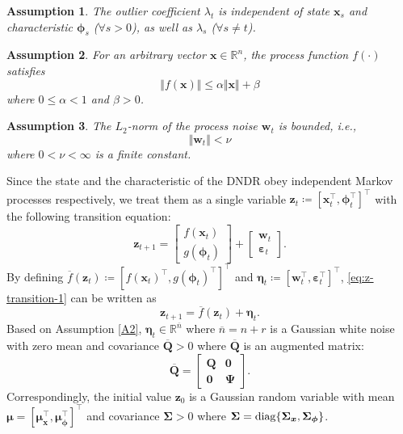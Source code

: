 \documentclass[10pt,twocolumn,twoside]{IEEEtran}
\newtheorem{assumption}{Assumption}
\newcommand{\diag}[1]{{\rm diag}\{#1\}}
\newcommand{\fs}{\text{.}} %
\newcommand{\x}{{ \bm{x} }}
\newcommand{\z}{{ \bm{z} }}
\begin{document}
\begin{assumption} \label{A3}
The outlier coefficient $\lambda_t$ is independent of state $\x_s$ and characteristic $\bm\phi_s$ ($\forall s>0$), as well as $\lambda_s$ ($\forall s\neq t$).
\end{assumption}

\begin{assumption} \label{A4}
For an arbitrary vector $\x\in\mathbb{R}^{n}$, the process function $f(\cdot)$ satisfies
$$
\Vert f(\x)\Vert \leq \alpha\Vert\x\Vert+\beta 
$$
where $0\leq\alpha<1$ and $\beta>0$.
\end{assumption}

\begin{assumption} \label{A5}
The $L_2$-norm of the process noise $\bm{w}_t$ is bounded, i.e.,
$$
\Vert\bm{w}_t\Vert < \nu
$$
where $0<\nu<\infty$ is a finite constant.
\end{assumption}

Since the state and the characteristic of the DNDR obey independent Markov processes respectively, we treat them as a single variable $\z_t\coloneqq[\x_t^\top,\bm\phi_t^\top]^\top$ with the following transition equation:
\begin{equation} \label{eq:z-transition-1}
    \z_{t+1} = \begin{bmatrix}
        f(\x_t) \\
        g(\bm\phi_t)
    \end{bmatrix} + \begin{bmatrix}
        \bm{w}_t \\
        \bm\varepsilon_t
    \end{bmatrix} \fs
\end{equation}
By defining $\overline{f}(\z_t)\coloneqq[f(\x_t)^\top,g(\bm\phi_t)^\top]^\top$ and $\bm\eta_t\coloneqq[\bm{w}_t^\top,\bm\varepsilon_t^\top]^\top$, \eqref{eq:z-transition-1} can be written as
\begin{equation} \label{eq:z-transition-2}
    \z_{t+1} = \overline{f}(\z_t) + \bm\eta_t \fs
\end{equation}
Based on Assumption \ref{A2}, $\bm\eta_t\in\mathbb{R}^{\overline{n}}$ where $\overline{n}=n+r$ is a Gaussian white noise with zero mean and covariance $\overline{\bm{Q}}>0$ where $\overline{\bm{Q}}$ is an augmented matrix:
$$
\overline{\bm{Q}} = \begin{bmatrix}
    \bm{Q} & \bm{0} \\
    \bm{0} & \bm{\Psi}
\end{bmatrix} \fs
$$
Correspondingly, the initial value $\z_0$ is a Gaussian random variable with mean $\bm\mu=[\bm\mu_\x^\top,\bm\mu_{\bm\phi}^\top]^\top$ and covariance $\bm\Sigma>0$ where $\bm\Sigma=\diag{\bm\Sigma_\x,\bm\Sigma_{\bm\phi}}$.
\end{document}

